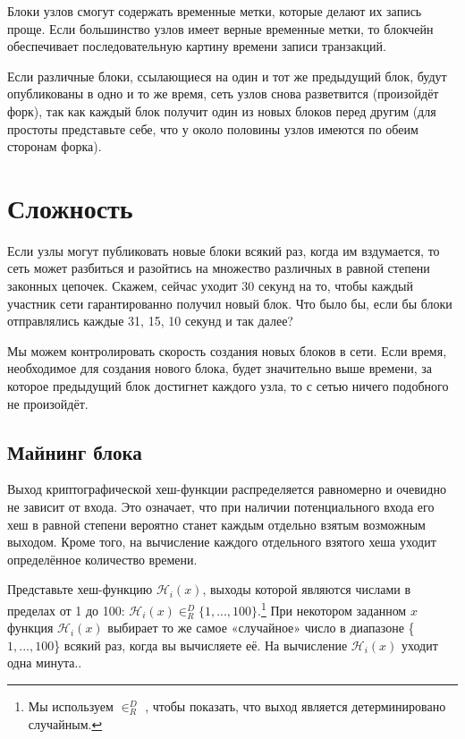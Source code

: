 Блоки узлов смогут содержать временные метки, которые делают их запись проще. Если большинство узлов имеет верные временные метки, то блокчейн обеспечивает последователь\-ную картину времени записи транзакций.

Если различные блоки, ссылающиеся на один и тот же предыдущий блок, будут опубликованы в одно и то же время, сеть узлов снова разветвится (произойдёт форк), так как каждый блок получит один из новых блоков перед другим (для простоты представьте себе, что у около половины узлов имеются по обеим сторонам форка).



\section{Сложность}
\label{sec:difficulty}

Если узлы могут публиковать новые блоки всякий раз, когда им вздумается, то сеть может разбиться и разойтись на множество различных в равной степени законных цепочек. Скажем, сейчас уходит 30 секунд на то, чтобы каждый участник сети гарантированно получил новый блок. Что было бы, если бы блоки отправлялись каждые 31, 15, 10 секунд и так далее?

Мы можем контролировать скорость создания новых блоков в сети. Если время, необходимое для создания нового блока, будет значительно выше времени, за которое предыдущий блок достигнет каждого узла, то с сетью ничего подобного не произойдёт.


\subsection{Майнинг блока}

Выход криптографической хеш-функции распределяется равномерно и очевидно не зависит от входа. Это означает, что при наличии потенциального входа его хеш в равной степени вероятно станет каждым отдельно взятым возможным выходом. Кроме того, на вычисление каждого отдельного взятого хеша уходит определённое количество времени.

Представьте хеш-функцию $\mathcal{H}_i(x)$, выходы которой являются числами в пределах от 1 до 100: $\mathcal{H}_i(x) \in^D_R \{1,...,100\}$.\footnote{Мы используем $\in^D_R$ , чтобы показать, что выход является детерминировано случайным.} При некотором заданном $x$ функция $\mathcal{H}_i(x)$ выбирает то же самое «случайное» число в диапазоне \{$1,...,100$\} всякий раз, когда вы вычисляете её. На вычисление $\mathcal{H}_i(x)$ уходит одна минута..

